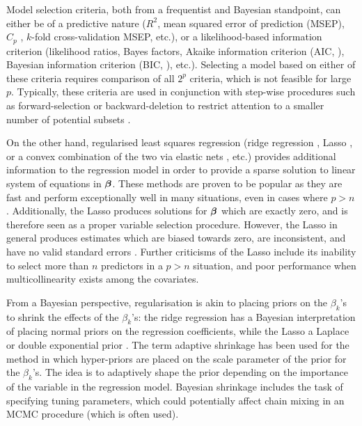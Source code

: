 \documentclass[a4paper,showframe,11pt]{report}
\begin{document}
Model selection criteria, both from a frequentist and Bayesian standpoint, can either be of a predictive nature ($R^2$, mean squared error of prediction (MSEP), $C_p$ \citep{mallows1973some}, $k$-fold cross-validation MSEP, etc.), or a likelihood-based information criterion (likelihood ratios, Bayes factors, Akaike information criterion (AIC, \cite{akaike1973}), Bayesian information criterion (BIC, \cite{schwarz1978estimating}), etc.).
Selecting a model based on either of these criteria requires comparison of all $2^p$ criteria, which is not feasible for large $p$.
Typically, these criteria are used in conjunction with step-wise procedures such as forward-selection or backward-deletion to restrict attention to a smaller number of potential subsets \citep{George1993,miller2002subset}.

On the other hand, regularised least squares regression (ridge regression \citep{hoerl1970ridge}, Lasso \citep{tibshirani1996regression}, or a convex combination of the two via elastic nets \citep{zou2005regularization}, etc.) provides additional information to the regression model in order to provide a sparse solution to linear system of equations in ${\bm\beta}$.
These methods are proven to be popular as they are fast and perform exceptionally well in many situations, even in cases where $p > n$.
Additionally, the Lasso produces solutions for ${\bm\beta}$ which are exactly zero, and is therefore seen as a proper variable selection procedure.
However, the Lasso in general produces estimates which are biased towards zero, are inconsistent, and have no valid standard errors \citep{friedman2001elements,kyung2010penalized}.
Further criticisms of the Lasso include its inability to select more than $n$ predictors in a $p>n$ situation, and poor performance when multicollinearity exists among the covariates.

From a Bayesian perspective, regularisation is akin to placing priors on the $\beta_k$'s to shrink the effects of the $\beta_k$'s: the ridge regression has a Bayesian interpretation of placing normal priors on the regression coefficients, while the Lasso a Laplace or double exponential prior \citep{park2008bayesian}.
The term adaptive shrinkage has been used for the method in which hyper-priors are placed on the scale parameter of the prior for the $\beta_k$'s.
The idea is to adaptively shape the prior depending on the importance of the variable in the regression model.
Bayesian shrinkage includes the task of specifying tuning parameters, which could potentially affect chain mixing in an MCMC procedure (which is often used).
\end{document}
